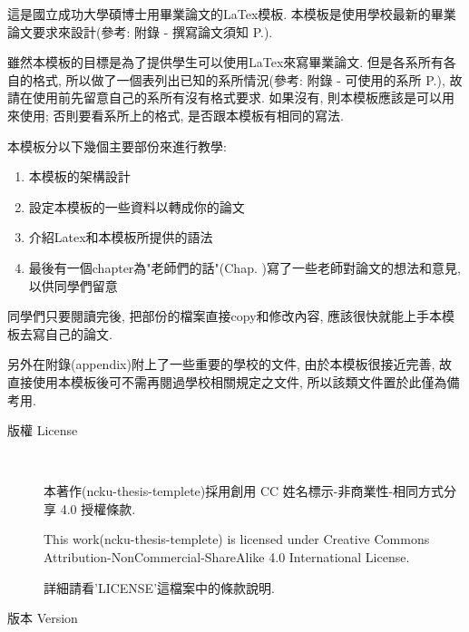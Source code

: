 

這是國立成功大學碩博士用畢業論文的LaTex模板. 本模板是使用學校最新的畢業論文要求來設計(參考: 附錄 - 撰寫論文須知 P.).

雖然本模板的目標是為了提供學生可以使用LaTex來寫畢業論文. 但是各系所有各自的格式, 所以做了一個表列出已知的系所情況(參考: 附錄 - 可使用的系所 P.), 故請在使用前先留意自己的系所有沒有格式要求. 如果沒有, 則本模板應該是可以用來使用; 否則要看系所上的格式, 是否跟本模板有相同的寫法.

本模板分以下幾個主要部份來進行教學:
\begin{enumerate}
  \item 本模板的架構設計
  \item 設定本模板的一些資料以轉成你的論文
  \item 介紹Latex和本模板所提供的語法
  \item 最後有一個chapter為"老師們的話"(Chap. )寫了一些老師對論文的想法和意見, 以供同學們留意
\end{enumerate}
同學們只要閱讀完後, 把部份的檔案直接copy和修改內容, 應該很快就能上手本模板去寫自己的論文.

另外在附錄(appendix)附上了一些重要的學校的文件, 由於本模板很接近完善, 故直接使用本模板後可不需再閱過學校相關規定之文件, 所以該類文件置於此僅為備考用.


\begin{description}
  \item[版權 License] \hfill \\

    本著作(ncku-thesis-templete)採用創用 CC 姓名標示-非商業性-相同方式分享 4.0 授權條款.

    This work(ncku-thesis-templete) is licensed under Creative Commons Attribution-NonCommercial-ShareAlike 4.0 International License.

  詳細請看'LICENSE'這檔案中的條款說明.

  \item[版本 Version] \hfill \\
    \ThisThesisVersion
\end{description}

\EndChapter
